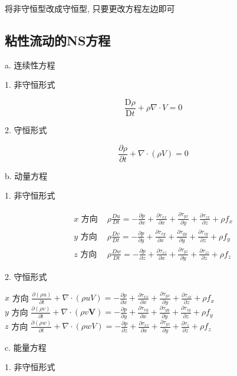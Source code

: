 将非守恒型改成守恒型, 只要更改方程左边即可

\subsection{粘性流动的NS方程}
a. 连续性方程

1. 非守恒形式

$$
	\frac{\mathrm{D} \rho}{\mathrm{D} t}+\rho \nabla \cdot V=0
$$

2. 守恒形式


$$
	\frac{\partial \rho}{\partial t}+\nabla \cdot(\rho V)=0
$$

b. 动量方程

1. 非守恒形式

$$
	\begin{array}{ll}
		x \text { 方向 } & \rho \frac{D u}{D t}=-\frac{\partial p}{\partial x}+\frac{\partial \tau_{x x}}{\partial x}+\frac{\partial \tau_{y x}}{\partial y}+\frac{\partial \tau_{z x}}{\partial z}+\rho f_{x} \\
		y \text { 方向 } & \rho \frac{D v}{D t}=-\frac{\partial p}{\partial y}+\frac{\partial \tau_{x y}}{\partial x}+\frac{\partial \tau_{y y}}{\partial y}+\frac{\partial \tau_{z y}}{\partial z}+\rho f_{y} \\
		z \text { 方向 } & \rho \frac{D w}{D t}=-\frac{\partial p}{\partial z}+\frac{\partial \tau_{x z}}{\partial x}+\frac{\partial \tau_{y z}}{\partial y}+\frac{\partial \tau_{z z}}{\partial z}+\rho f_{z}
	\end{array}
$$

2. 守恒形式

$x$ 方向 $\frac{\partial(\rho u)}{\partial t}+\nabla \cdot(\rho u V)=-\frac{\partial p}{\partial x}+\frac{\partial \tau_{x x}}{\partial x}+\frac{\partial \tau_{y x}}{\partial y}+\frac{\partial \tau_{z x}}{\partial z}+\rho f_{x}$  \\
$y$ 方向 $\frac{\partial(\rho v)}{\partial t}+\nabla \cdot(\rho v \boldsymbol{V})=-\frac{\partial p}{\partial y}+\frac{\partial \tau_{x y}}{\partial x}+\frac{\partial \tau_{y y}}{\partial y}+\frac{\partial \tau_{z y}}{\partial z}+\rho f_{y}$ \\
$z$ 方向 $\frac{\partial(\rho w)}{\partial t}+\nabla \cdot(\rho w V)=-\frac{\partial p}{\partial z}+\frac{\partial \tau_{x z}}{\partial x}+\frac{\partial \tau_{y z}}{\partial y}+\frac{\partial \tau_{z}}{\partial z}+\rho f_{z}$

c. 能量方程

1. 非守恒形式

